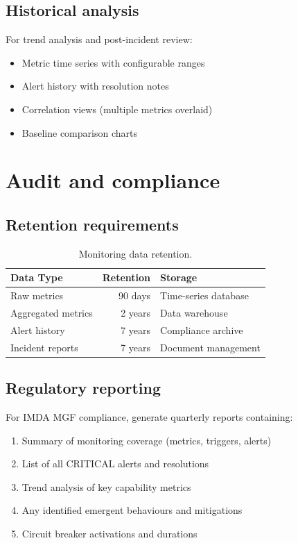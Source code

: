 \documentclass[11pt,a4paper,twoside]{report}
\begin{document}
\subsection{Historical analysis}

For trend analysis and post-incident review:

\begin{itemize}
\item Metric time series with configurable ranges
\item Alert history with resolution notes
\item Correlation views (multiple metrics overlaid)
\item Baseline comparison charts
\end{itemize}

\section{Audit and compliance}

\subsection{Retention requirements}

\begin{table}[htbp]
\centering
\caption{Monitoring data retention.}
\label{tab:monitor-retention}
\footnotesize
\begin{tabularx}{\linewidth}{@{}l r X@{}}
\toprule
\textbf{Data Type} & \textbf{Retention} & \textbf{Storage} \\ \midrule
Raw metrics & 90 days & Time-series database \\
Aggregated metrics & 2 years & Data warehouse \\
Alert history & 7 years & Compliance archive \\
Incident reports & 7 years & Document management \\
\bottomrule
\end{tabularx}
\end{table}

\subsection{Regulatory reporting}

For IMDA MGF compliance, generate quarterly reports containing:

\begin{enumerate}
\item Summary of monitoring coverage (metrics, triggers, alerts)
\item List of all CRITICAL alerts and resolutions
\item Trend analysis of key capability metrics
\item Any identified emergent behaviours and mitigations
\item Circuit breaker activations and durations
\end{enumerate}
\end{document}

